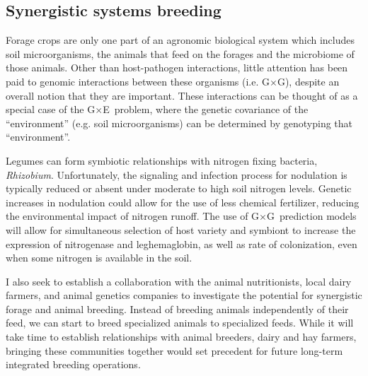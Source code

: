 \documentclass[11pt]{article}
\newcommand{\gxe}{G$\times$E}
\newcommand{\gxg}{G$\times$G}
\begin{document}
\subsection*{Synergistic systems breeding}

Forage crops are only one part of an agronomic biological system which includes soil microorganisms, the animals that feed on the forages and the microbiome of those animals. Other than host-pathogen interactions, little attention has been paid to genomic interactions between these organisms (i.e. \gxg), despite an overall notion that they are important. These interactions can be thought of as a special case of the \gxe\ problem, where the genetic covariance of the ``environment'' (e.g. soil microorganisms) can be determined by genotyping that ``environment''. %


Legumes can form symbiotic relationships with nitrogen fixing bacteria, \emph{Rhizobium}. Unfortunately, the signaling and infection process for nodulation is typically reduced or absent under moderate to high soil nitrogen levels. Genetic increases in nodulation could allow for the use of less chemical fertilizer, reducing the environmental impact of nitrogen runoff. The use of \gxg\ prediction models will allow for simultaneous selection of host variety and symbiont to increase the expression of nitrogenase and leghemaglobin, as well as rate of colonization, even when some nitrogen is available in the soil.


I also seek to establish a collaboration with the animal nutritionists, local dairy farmers, and animal genetics companies to investigate the potential for synergistic forage and animal breeding. Instead of breeding animals independently of their feed, we can start to breed specialized animals to specialized feeds. While it will take time to establish relationships with animal breeders, dairy and hay farmers, bringing these communities together would set precedent for future long-term integrated breeding operations.
\end{document}

